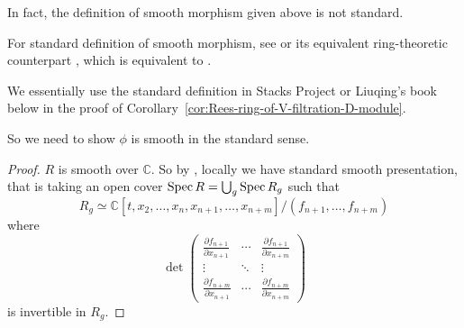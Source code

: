 \begin{remark}[\textcolor{red}{Warning}]
    In fact, the definition of smooth morphism given above is not standard.

    For standard definition of smooth morphism, see \cite[Section~4.3.3, Definition~3.35]{liu2002algebraic} or its equivalent ring-theoretic counterpart \cite[\href{https://stacks.math.columbia.edu/tag/00TF}{Tag 00TF}]{stacks-project}, which is equivalent to \cite[\href{https://stacks.math.columbia.edu/tag/00T2}{Tag 00T2}]{stacks-project}.

    We essentially use the standard definition in Stacks Project or Liuqing's book below in the proof of Corollary~\ref{cor:Rees-ring-of-V-filtration-D-module}.

    So we need to show $\phi$ is smooth in the standard sense.

    \begin{proof}
        $R$ is smooth over $\mathbb{C}$. So by \cite[\href{https://stacks.math.columbia.edu/tag/00TA}{Tag 00TA}]{stacks-project}, locally we have standard smooth presentation, that is taking an open cover $\operatorname{Spec} R = \bigcup_g \operatorname{Spec} R_g$ such that
        $$
            R_g \simeq \mathbb{C}[t, x_2, \ldots, x_n, x_{n+1}, \ldots, x_{n+m}]/(f_{n+1}, \ldots, f_{n+m})
        $$
        where
        $$
            \det \begin{pmatrix} \frac{\partial f_{n+1}}{\partial x_{n+1}} & \cdots & \frac{\partial f_{n+1}}{\partial x_{n+m}} \\ \vdots & \ddots & \vdots \\ \frac{\partial f_{n+m}}{\partial x_{n+1}} & \cdots & \frac{\partial f_{n+m}}{\partial x_{n+m}} \end{pmatrix}
        $$
        is invertible in $R_g$.



\end{proof}
\end{remark}
